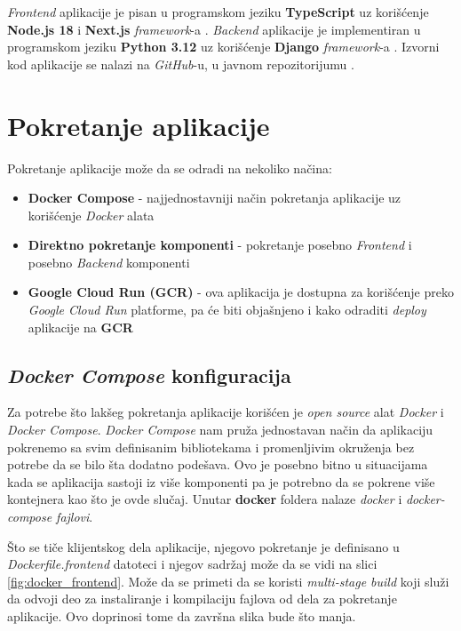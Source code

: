 \documentclass[12pt,oneside]{memoir}
\begin{document}
\emph{Frontend} aplikacije je pisan u programskom jeziku \textbf{TypeScript} \cite{typescript} uz korišćenje \textbf{Node.js 18} \cite{node} i \textbf{Next.js} \emph{framework}-a \cite{next}.
\emph{Backend} aplikacije je implementiran u programskom jeziku \textbf{Python 3.12} \cite{python} uz korišćenje \textbf{Django} \emph{framework}-a \cite{django}. Izvorni kod aplikacije se nalazi na \emph{GitHub}-u, u javnom repozitorijumu \cite{github}.

\section{Pokretanje aplikacije}

Pokretanje aplikacije može da se odradi na nekoliko načina:
\begin{itemize}
    \item \textbf{Docker Compose} \cite{docker_compose} - najjednostavniji način pokretanja aplikacije uz korišćenje \emph{Docker} alata \cite{docker}
    \item \textbf{Direktno pokretanje komponenti} - pokretanje posebno \emph{Frontend} i posebno \emph{Backend} komponenti
    \item \textbf{Google Cloud Run (GCR)} \cite{gcr} - ova aplikacija je dostupna za korišćenje preko \emph{Google Cloud Run} platforme, pa će biti objašnjeno i kako odraditi \emph{deploy} aplikacije na \textbf{GCR}
\end{itemize}

\subsection{\emph{Docker Compose} konfiguracija}
Za potrebe što lakšeg pokretanja aplikacije korišćen je \emph{open source} alat \emph{Docker} i \emph{Docker Compose}. \emph{Docker Compose} nam pruža jednostavan način da aplikaciju pokrenemo sa svim definisanim bibliotekama i promenljivim okruženja bez potrebe da se bilo šta dodatno podešava. Ovo je posebno bitno u situacijama kada se aplikacija sastoji iz više komponenti pa je potrebno da se pokrene više kontejnera kao što je ovde slučaj.
Unutar \textbf{docker} foldera nalaze \emph{docker} i \emph{docker-compose fajlovi}.

Što se tiče klijentskog dela aplikacije, njegovo pokretanje je definisano u \emph{Dockerfile.frontend} datoteci i njegov sadržaj može da se vidi na slici \ref{fig:docker_frontend}. Može da se primeti da se koristi \emph{multi-stage build} koji služi da odvoji deo za instaliranje i kompilaciju fajlova od dela za pokretanje aplikacije. Ovo doprinosi tome da završna slika bude što manja.
\end{document}
